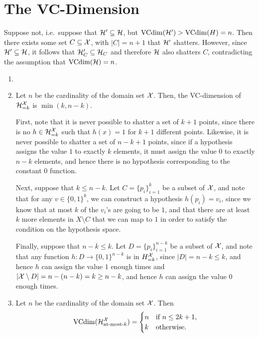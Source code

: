 \chapter{The VC-Dimension}

\begin{ex}
  Suppose not, i.e.\ suppose that $\mathcal{H}'\subseteq \mathcal{H}$, but
  $\operatorname*{VCdim}(\mathcal{H}')>\operatorname*{VCdim}(H)=n$. Then there exists some set $C\subseteq \mathcal{X}$, with
  $|C|=n+1$ that $\mathcal{H}'$ shatters. However, since $\mathcal{H}'\subseteq \mathcal{H}$, it follows
  that $\mathcal{H}'_C\subseteq \mathcal{H}_C$ and therefore $\mathcal{H}$ also shatters $C$,
  contradicting the assumption that $\operatorname*{VCdim}(\mathcal{H})=n$.
\end{ex}

\begin{ex}
  \begin{enumerate}
    \item[]
    \item Let $n$ be the cardinality of the domain set $\mathcal{X}$. Then, the
          VC-dimension of $\mathcal{H}^{\mathcal{X}}_{=k}$ is $\min(k, n-k)$.

          First, note that it is never possible to shatter a set of $k+1$
          points, since there is no $h\in\mathcal{H}^{\mathcal{X}}_{=k}$ such that $h(x)=1$ for
          $k+1$ different points. Likewise, it is never possible to shatter a
          set of $n-k+1$ points, since if a hypothesis assigns the value $1$ to
          exactly $k$ elements, it must assign the value $0$ to exactly $n-k$
          elements, and hence there is no hypothesis corresponding to the
          constant $0$ function.

          Next, suppose that $k\leq n-k$. Let $C=\{p_i\}_{i=1}^k$ be a subset of
          $\mathcal{X}$, and note that for any $v\in\{0,1\}^k$, we can construct a
          hypothesis $h(p_i)=v_i$, since we know that at most $k$ of the $v_i$'s
          are going to be $1$, and that there are at least $k$ more elements in
          $X\setminus C$ that we can map to $1$ in order to satisfy the
          condition on the hypothesis space.

          Finally, suppose that $n-k\leq k$. Let $D=\{p_i\}_{i=1}^{n-k}$ be a
          subset of $\mathcal{X}$, and note that any function $h:D\to \{0,1\}^{n-k}$ is
          in $H^{\mathcal{X}}_{=k}$, since $|D|=n-k\leq k$, and hence $h$ can assign the
          value $1$ enough times and $|\mathcal{X}\setminus D|=n-(n-k)=k\geq n-k$, and
          hence $h$ can assign the value $0$ enough times.
    \item Let $n$ be the cardinality of the domain set $\mathcal{X}$. Then
          \begin{align*}
            \operatorname*{VCdim}(\mathcal{H}^{\mathcal{X}}_{\text{at-most-$k$}})=\begin{cases}
              n & \text{if $n\leq 2k+1$}, \\
              k & \text{otherwise}.
            \end{cases}
          \end{align*}


\end{enumerate}
\end{ex}
